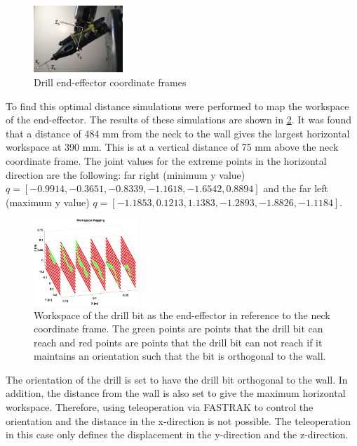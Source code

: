 \documentclass[letterpaper, 10 pt, conference]{IEEEtran}
\begin{document}
\begin{figure}[h]
  \centering
  \includegraphics[width=0.3\textwidth]{figures/Drill-Coordinates}
  \caption{Drill end-effector coordinate frames}
  \label{fig:drillCoordinates}
\end{figure}

To find this optimal distance simulations were performed to map the workspace of the end-effector. The results of these simulations are shown in \cref{fig:eeWorkspace}. It was found that a distance of 484 mm from the neck to the wall gives the largest horizontal workspace at 390 mm. This is at a vertical distance of 75 mm above the neck coordinate frame. The joint values for the extreme points in the horizontal direction are the following: far right (minimum y value) $q = [-0.9914, -0.3651, -0.8339, -1.1618, -1.6542, 0.8894]$ and the far left (maximum y value) $q = [-1.1853, 0.1213, 1.1383, -1.2893, -1.8826, -1.1184]$.

\begin{figure}[h]
  \centering
  \includegraphics[width=0.35\textwidth]{figures/eeWorkspace}
  \caption{Workspace of the drill bit as the end-effector in reference to the neck coordinate frame. The green points are points that the drill bit can reach and red points are points that the drill bit can not reach if it maintains an orientation such that the bit is orthogonal to the wall. }
  \label{fig:eeWorkspace}
\end{figure}

The orientation of the drill is set to have the drill bit orthogonal to the wall. In addition, the distance from the wall is also set to give the maximum horizontal workspace. Therefore, using teleoperation via FASTRAK to control the orientation and the distance in the x-direction is not possible. The teleoperation in this case only defines the displacement in the y-direction and the z-direction.
\end{document}
